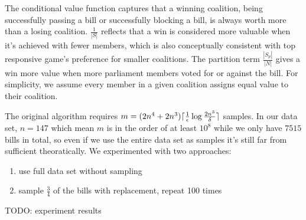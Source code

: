 \documentclass[letterpaper]{article} %
\DeclarePairedDelimiter{\ceil}{\lceil}{\rceil}
\begin{document}
The conditional value function captures that a winning coalition, being successfully passing a bill or successfully blocking a bill, is always worth more than a losing coalition. $\frac{1}{|S|}$ reflects that a win is considered more valuable when it's achieved with fewer members, which is also conceptually consistent with top responsive game's preference for smaller coalitions. The partition term $\frac{|S_p|}{|N|}$ gives a win more value when more parliament members voted for or against the bill. For simplicity, we assume every member in a given coalition assigns equal value to their coalition.

The original algorithm requires $m = (2n^4 + 2n^3)\ceil{\frac{1}{\epsilon}\log{\frac{2n^3}{\delta}}}$ samples. In our data set, $n = 147$ which mean $m$ is in the order of at least $10^8$ while we only have $7515$ bills in total, so even if we use the entire data set as samples it's still far from sufficient theoratically. We experimented with two approaches:

\begin{enumerate}
  \item use full data set without sampling
  \item sample $\frac{3}{4}$ of the bills with replacement, repeat 100 times
\end{enumerate}

TODO: experiment results



\end{document}
